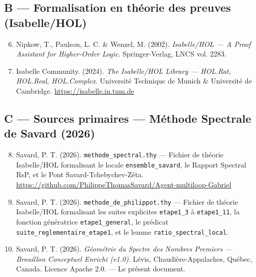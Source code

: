 \documentclass[11pt,a4paper]{article}
\begin{document}
\subsection*{B --- Formalisation en théorie des preuves (Isabelle/HOL)}

\begin{enumerate}\setcounter{enumi}{5}
\item Nipkow, T., Paulson, L. C. \& Wenzel, M. (2002). \emph{Isabelle/HOL --- A Proof Assistant for Higher-Order Logic}. Springer-Verlag, LNCS vol. 2283.

\item Isabelle Community. (2024). \emph{The Isabelle/HOL Library --- HOL.Rat, HOL.Real, HOL.Complex}. Université Technique de Munich \& Université de Cambridge. \url{https://isabelle.in.tum.de}
\end{enumerate}

\subsection*{C --- Sources primaires --- Méthode Spectrale de Savard (2026)}

\begin{enumerate}\setcounter{enumi}{7}
\item Savard, P. T. (2026). \texttt{methode\_spectral.thy} --- Fichier de théorie Isabelle/HOL formalisant le locale \texttt{ensemble\_savard}, le Rapport Spectral RsP, et le Pont Savard-Tchebychev-Zêta. \url{https://github.com/PhilippeThomasSavard/Agent-multiloop-Gabriel}

\item Savard, P. T. (2026). \texttt{methode\_de\_philippot.thy} --- Fichier de théorie Isabelle/HOL formalisant les suites explicites \texttt{etape1\_3} à \texttt{etape1\_11}, la fonction génératrice \texttt{etape1\_general}, le prédicat \texttt{suite\_reglementaire\_etape1}, et le lemme \texttt{ratio\_spectral\_local}.

\item Savard, P. T. (2026). \emph{Géométrie du Spectre des Nombres Premiers --- Brouillon Conceptuel Enrichi (v1.0)}. Lévis, Chaudière-Appalaches, Québec, Canada. Licence Apache 2.0. --- Le présent document.
\end{enumerate}
\end{document}
